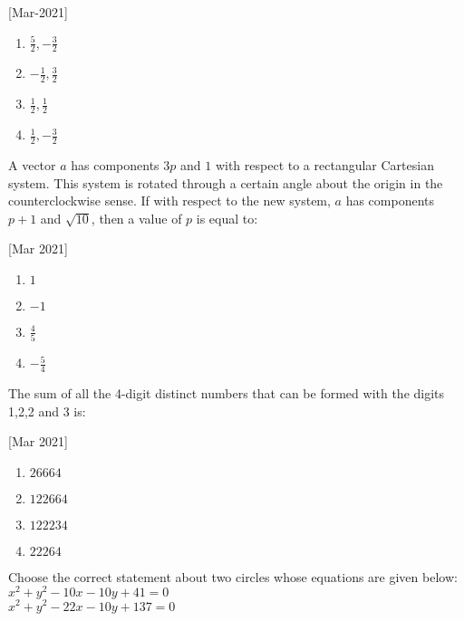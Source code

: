 				\hfill{[Mar-2021]}
					\begin{multicols}{4}
                \begin{enumerate}
    \item $ \frac{5}{2}, -\frac{3}{2} $
    \item $ -\frac{1}{2}, \frac{3}{2} $
    \item $ \frac{1}{2}, \frac{1}{2} $
    \item $ \frac{1}{2}, -\frac{3}{2} $
                \end{enumerate}
					\end{multicols}
	\item
		A vector $a$ has components $3p$ and $1$ with respect to a rectangular Cartesian system. This system is rotated through a certain angle about the origin in the counterclockwise sense. If with respect to the new system, $a$ has components $p+1$ and $\sqrt{10}$, then a value of $p$ is equal to:

			\hfill{[Mar 2021]}
			\begin{multicols}{4}
		\begin{enumerate}
    \item $ 1 $
    \item $ -1 $
    \item $ \frac{4}{5} $
    \item $ -\frac{5}{4} $
                \end{enumerate}
			\end{multicols}
	\item
		The sum of all the 4-digit distinct numbers that can be formed with the digits 1,2,2 and 3 is:

			\hfill{[Mar 2021]}
			\begin{multicols}{2}
		\begin{enumerate}
    \item $ 26664 $
    \item $ 122664 $
    \item $ 122234 $
    \item $ 22264 $
                \end{enumerate}
			\end{multicols}
	\item
                Choose the correct statement about two circles whose equations are given below:\\
$ x^2 + y^2 - 10x - 10y + 41 = 0 $\\
$ x^2 + y^2 - 22x - 10y + 137 = 0 $\\

